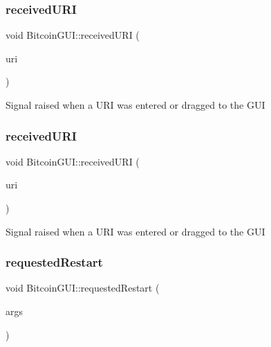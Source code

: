 \subsubsection{\texorpdfstring{receivedURI}{receivedURI}\hspace{0.1cm}{\footnotesize\ttfamily [1/2]}}
{\footnotesize\ttfamily void Bitcoin\+G\+U\+I\+::received\+U\+RI (\begin{DoxyParamCaption}\item[{const Q\+String \&}]{uri }\end{DoxyParamCaption})\hspace{0.3cm}{\ttfamily [signal]}}

Signal raised when a U\+RI was entered or dragged to the G\+UI \mbox{\label{class_bitcoin_g_u_i_a15d55a3b292c9eec64298797d262fa32}} 
\subsubsection{\texorpdfstring{receivedURI}{receivedURI}\hspace{0.1cm}{\footnotesize\ttfamily [2/2]}}
{\footnotesize\ttfamily void Bitcoin\+G\+U\+I\+::received\+U\+RI (\begin{DoxyParamCaption}\item[{const Q\+String \&}]{uri }\end{DoxyParamCaption})\hspace{0.3cm}{\ttfamily [signal]}}

Signal raised when a U\+RI was entered or dragged to the G\+UI \mbox{\label{class_bitcoin_g_u_i_aa16b27ff0eab480255ba86b7d0486034}} 
\subsubsection{\texorpdfstring{requestedRestart}{requestedRestart}\hspace{0.1cm}{\footnotesize\ttfamily [1/2]}}
{\footnotesize\ttfamily void Bitcoin\+G\+U\+I\+::requested\+Restart (\begin{DoxyParamCaption}\item[{Q\+String\+List}]{args }\end{DoxyParamCaption})\hspace{0.3cm}{\ttfamily [signal]}}


